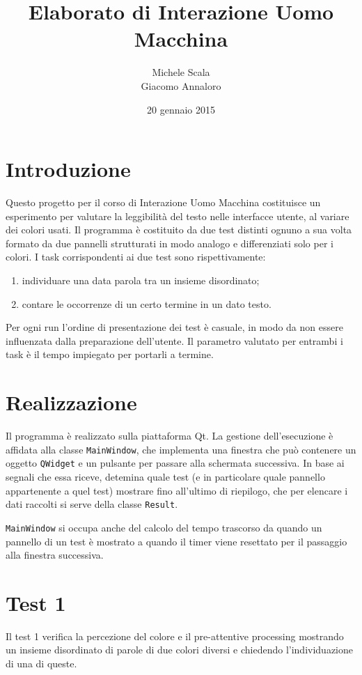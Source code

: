 \documentclass[a4paper]{article}
\begin{document}
\title{Elaborato di Interazione Uomo Macchina}
\author{Michele Scala \\ Giacomo Annaloro}
\date{20 gennaio 2015}
\maketitle


\section{Introduzione}
Questo progetto per il corso di Interazione Uomo Macchina costituisce un esperimento per valutare la leggibilità del testo nelle interfacce utente, al variare dei colori usati. Il programma è costituito da due test distinti ognuno a sua volta formato da due pannelli strutturati in modo analogo e differenziati solo per i colori.
I task corrispondenti ai due test sono rispettivamente:
\begin{enumerate}
\item individuare una data parola tra un insieme disordinato;
\item contare le occorrenze di un certo termine in un dato testo.
\end{enumerate}
Per ogni run l'ordine di presentazione dei test è casuale, in modo da non essere influenzata dalla preparazione dell'utente. 
Il parametro valutato per entrambi i task è il tempo impiegato per portarli a termine.

\section{Realizzazione}
Il programma è realizzato sulla piattaforma Qt. 
La gestione dell'esecuzione è affidata alla classe \verb:MainWindow:, che implementa una finestra che può contenere un oggetto \verb:QWidget: e un pulsante per passare alla schermata successiva. In base ai segnali che essa riceve, detemina quale test (e in particolare quale pannello appartenente a quel test) mostrare fino all'ultimo di riepilogo, che per elencare i dati raccolti si serve della classe \verb:Result:.

\verb:MainWindow: si occupa anche del calcolo del tempo trascorso da quando un pannello di un test è mostrato a quando il timer viene resettato per il passaggio alla finestra successiva.

\pagebreak

\section{Test 1}
Il test 1 verifica la percezione del colore e il pre-attentive processing mostrando un insieme disordinato di parole di due colori diversi e chiedendo l'individuazione di una di queste.
\end{document}
